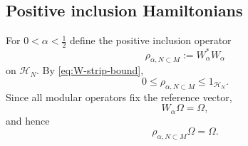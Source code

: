\documentclass[a4paper,11pt]{article}
\theoremstyle{definition}
\begin{document}


\subsection{Positive inclusion Hamiltonians}

For $0<\alpha<\frac12$ define the positive inclusion operator
\begin{equation}
    \boxed{
    \rho_{\alpha,N\subset M}
    :=
    W_\alpha^*W_\alpha
    }
    \label{eq:rho-alpha-general}
\end{equation}
on $\mathcal H_N$. By \eqref{eq:W-strip-bound},
\begin{equation}
    0\leq
    \rho_{\alpha,N\subset M}
    \leq
    1_{\mathcal H_N}.
    \label{eq:rho-alpha-contraction}
\end{equation}
Since all modular operators fix the reference vector,
\begin{equation}
    W_\alpha\Omega=\Omega,
\end{equation}
and hence
\begin{equation}
    \boxed{
    \rho_{\alpha,N\subset M}\Omega=\Omega .
    }
    \label{eq:rho-alpha-vacuum}
\end{equation}
\end{document}

